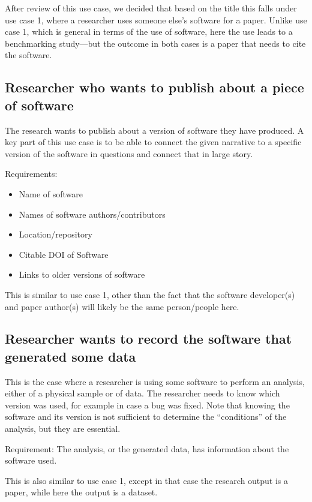 \documentclass[12pt, oneside]{amsart}
\begin{document}
After review of this use case, we decided that based on the title this falls under
use case 1, where a researcher uses someone else's software for a paper.
Unlike use case 1, which is general in terms of the use of software, here the
use leads to a benchmarking study---but the outcome in both cases is a paper
that needs to cite the software.

\subsection*{Researcher who wants to publish about a piece of software}

The research wants to publish about a version of software they have produced.
A key part of this use case is to be able to connect the given narrative to a specific version of the software in questions and connect that in large story.

Requirements:
\begin{itemize}
\item Name of software
\item Names of software authors/contributors
\item Location/repository
\item Citable DOI of Software
\item Links to older versions of software
\end{itemize}

This is similar to use case 1, other than the fact that the software developer(s) and
paper author(s) will likely be the same person\slash people here.


\subsection*{Researcher wants to record the software that generated some data}

This is the case where a researcher is using some software to perform an analysis, either of a physical sample or of data.
The researcher needs to know which version was used, for example in case a bug was fixed.
Note that knowing the software and its version is not sufficient to determine the ``conditions'' of the analysis, but they are essential.

Requirement:
The analysis, or the generated data, has information about the software used.

This is also similar to use case 1, except in that case the research output is
a paper, while here the output is a dataset.
\end{document}
